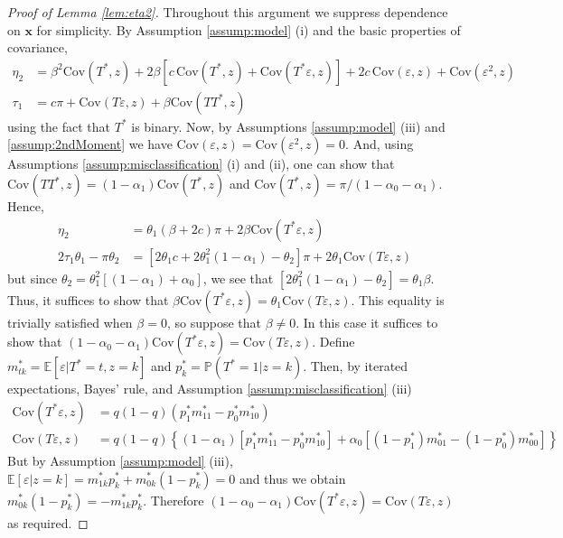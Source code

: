 \begin{proof}[Proof of Lemma \ref{lem:eta2}]
  Throughout this argument we suppress dependence on $\mathbf{x}$ for simplicity. 
  By Assumption \ref{assump:model} (i) and the basic properties of covariance, 
\begin{align*}
    \eta_2 &= \beta^2 \mbox{Cov}(T^*,z) + 2 \beta\left[ c\, \mbox{Cov}(T^*,z) + \mbox{Cov}(T^*\varepsilon,z)  \right] + 2c \, \mbox{Cov}(\varepsilon,z) + \mbox{Cov}(\varepsilon^2,z)\\
  \tau_1 &= c \pi + \mbox{Cov}(T\varepsilon,z) + \beta \mbox{Cov}(TT^*,z)
\end{align*}
using the fact that $T^*$ is binary. 
Now, by Assumptions \ref{assump:model} (iii) and \ref{assump:2ndMoment} we have $\mbox{Cov}(\varepsilon,z) = \mbox{Cov}(\varepsilon^2,z) = 0$.
And, using Assumptions \ref{assump:misclassification} (i) and (ii), one can show that $\mbox{Cov}(TT^*,z) = (1 - \alpha_1)\mbox{Cov}(T^*,z)$ and $\mbox{Cov}(T^*,z) = \pi/(1 - \alpha_0 - \alpha_1)$.
Hence, 
\begin{align*}
  \eta_2 &= \theta_1\left( \beta 
+ 2 c \right) \pi + 2\beta \mbox{Cov}(T^*\varepsilon,z) \\
  2 \tau_1 \theta_1 - \pi \theta_2 &= \left[2\theta_1 c + 2 \theta_1^2 (1 - \alpha_1) - \theta_2\right]\pi + 2\theta_1 \mbox{Cov}(T\varepsilon,z) 
\end{align*}
but since $\theta_2 = \theta_1^2 \left[ (1 - \alpha_1) + \alpha_0 \right]$, we see that $[2\theta_1^2(1 - \alpha_1) - \theta_2] = \theta_1 \beta$.
Thus, it suffices to show that $\beta \mbox{Cov}(T^*\varepsilon,z) = \theta_1 \mbox{Cov}(T\varepsilon,z)$.
This equality is trivially satisfied when $\beta=0$, so suppose that $\beta \neq 0$. 
In this case it suffices to show that $(1 - \alpha_0 - \alpha_1) \mbox{Cov}(T^*\varepsilon,z) = \mbox{Cov}(T\varepsilon,z)$.
Define $m^*_{tk} = \mathbb{E}\left[ \varepsilon|T^*=t,z=k \right]$ and $p^*_k = \mathbb{P}(T^*=1|z=k)$.
Then, by iterated expectations, Bayes' rule, and Assumption \ref{assump:misclassification} (iii)
\begin{align*}
  \mbox{Cov}(T^*\varepsilon,z) &=q(1 - q)\left(p_1^* m_{11}^*  - p_0^*m_{10}^* \right) \\
  \mbox{Cov}(T\varepsilon,z) &= q(1 - q)\left\{ (1 - \alpha_1)\left[ p_1^* m_{11}^* - p_0^* m_{10}^* \right] + \alpha_0\left[ (1 - p_1^*) m_{01}^* - (1 - p_0^*)m_{00}^* \right] \right\} 
\end{align*}
But by Assumption \ref{assump:model} (iii), $\mathbb{E}[\varepsilon|z=k] = m_{1k}^*p_{k}^* + m_{0k}^*(1 - p_k^*)=0$ and thus we obtain $m_{0k}^*(1 - p_k^*)= - m_{1k}^* p_k^*$.
Therefore  $(1 - \alpha_0 - \alpha_1) \mbox{Cov}(T^*\varepsilon,z) = \mbox{Cov}(T\varepsilon,z)$ as required.
\end{proof}

